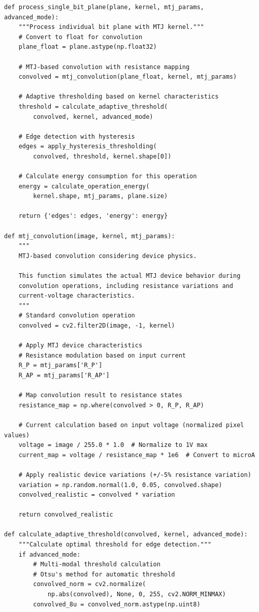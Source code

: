 \documentclass[conference]{IEEEtran}
\begin{document}
\begin{lstlisting}[caption={Complete MTJ edge detection pipeline implementation}]
def process_single_bit_plane(plane, kernel, mtj_params, advanced_mode):
    """Process individual bit plane with MTJ kernel."""
    # Convert to float for convolution
    plane_float = plane.astype(np.float32)
    
    # MTJ-based convolution with resistance mapping
    convolved = mtj_convolution(plane_float, kernel, mtj_params)
    
    # Adaptive thresholding based on kernel characteristics
    threshold = calculate_adaptive_threshold(
        convolved, kernel, advanced_mode)
    
    # Edge detection with hysteresis
    edges = apply_hysteresis_thresholding(
        convolved, threshold, kernel.shape[0])
    
    # Calculate energy consumption for this operation
    energy = calculate_operation_energy(
        kernel.shape, mtj_params, plane.size)
    
    return {'edges': edges, 'energy': energy}

def mtj_convolution(image, kernel, mtj_params):
    """
    MTJ-based convolution considering device physics.
    
    This function simulates the actual MTJ device behavior during 
    convolution operations, including resistance variations and 
    current-voltage characteristics.
    """
    # Standard convolution operation
    convolved = cv2.filter2D(image, -1, kernel)
    
    # Apply MTJ device characteristics
    # Resistance modulation based on input current
    R_P = mtj_params['R_P']
    R_AP = mtj_params['R_AP']
    
    # Map convolution result to resistance states
    resistance_map = np.where(convolved > 0, R_P, R_AP)
    
    # Current calculation based on input voltage (normalized pixel values)
    voltage = image / 255.0 * 1.0  # Normalize to 1V max
    current_map = voltage / resistance_map * 1e6  # Convert to microA
    
    # Apply realistic device variations (+/-5% resistance variation)
    variation = np.random.normal(1.0, 0.05, convolved.shape)
    convolved_realistic = convolved * variation
    
    return convolved_realistic

def calculate_adaptive_threshold(convolved, kernel, advanced_mode):
    """Calculate optimal threshold for edge detection."""
    if advanced_mode:
        # Multi-modal threshold calculation
        # Otsu's method for automatic threshold
        convolved_norm = cv2.normalize(
            np.abs(convolved), None, 0, 255, cv2.NORM_MINMAX)
        convolved_8u = convolved_norm.astype(np.uint8)
        

\end{lstlisting}
\end{document}
